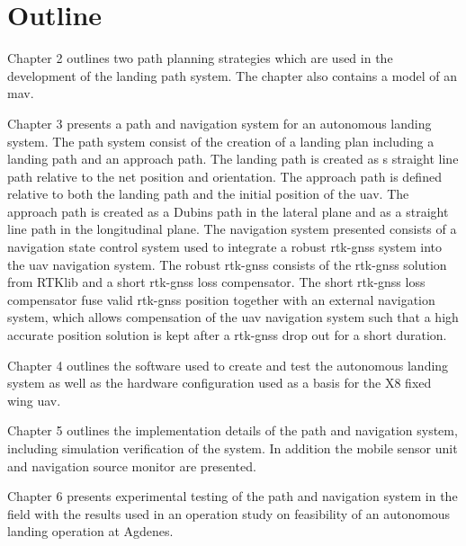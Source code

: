 \section{Outline}
Chapter 2 outlines two path planning strategies which are used in the development of the landing path system. The chapter also contains a model of an \gls{mav}.

Chapter 3 presents a path and navigation system for an autonomous landing system. The path system consist of the creation of a landing plan including a landing path and an approach path. The landing path is created as s straight line path relative to the net position and orientation. The approach path is defined relative to both the landing path and the initial position of the \gls{uav}. The approach path is created as a Dubins path in the lateral plane and as a straight line path in the longitudinal plane. The navigation system presented consists of a navigation state control system used to integrate a robust \gls{rtk-gnss} system into the \gls{uav} navigation system. The robust \gls{rtk-gnss} consists of the \gls{rtk-gnss} solution from RTKlib and a short \gls{rtk-gnss} loss compensator. The short \gls{rtk-gnss} loss compensator fuse valid \gls{rtk-gnss} position together with an external navigation system, which allows compensation of the \gls{uav} navigation system such that a high accurate position solution is kept after a \gls{rtk-gnss} drop out for a short duration.


Chapter 4 outlines the software used to create and test the autonomous landing system as well as the hardware configuration used as a basis for the X8 fixed wing \gls{uav}.

Chapter 5 outlines the implementation details of the path and navigation system, including simulation verification of the system. In addition the mobile sensor unit and navigation source monitor are presented.

Chapter 6 presents experimental testing of the path and navigation system in the field with the results used in an operation study on feasibility of an autonomous landing operation at Agdenes.

